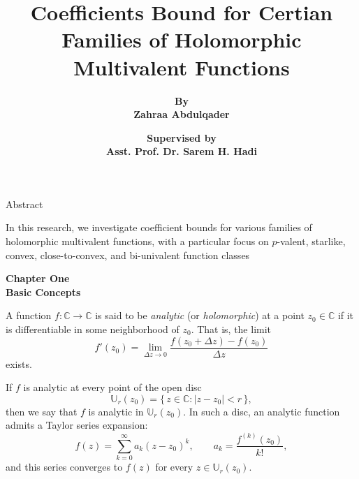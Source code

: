 \documentclass{beamer}
\title{Coefficients Bound for Certian Families of Holomorphic Multivalent Functions}
\author{\textbf{By}\\ \textbf{Zahraa Abdulqader}}
\date{\textbf{Supervised by}\\ \textbf{Asst. Prof. Dr. Sarem H. Hadi}}
\newcommand{\C}{\mathbb{C}}
\newcommand{\U}{\mathbb{U}}
\begin{document}
	\frame{\titlepage}
	
	
	\begin{frame}{Abstract}
		
		
		In this research, we investigate coefficient bounds for various families of holomorphic multivalent functions, with a particular focus on $p$-valent, starlike, convex, close-to-convex, and bi-univalent function classes
	\end{frame}
	
	\begin{frame}
		\begin{center}
			\Huge \textbf{Chapter One}\\[40pt]
			\textbf{Basic Concepts}
		\end{center}
	\end{frame}
	
	
	
	
	
	
	\begin{frame}
\begin{definition}
	
	A function \(f : \C \to \C\) is said to be \emph{analytic} (or \emph{holomorphic}) at a point \(z_0 \in \C\) if it is differentiable in some neighborhood of \(z_0\). That is, the limit
	\begin{equation}\label{eq:def-derivative}
		f'(z_0) = \lim_{\Delta z \to 0} \frac{f(z_0 + \Delta z) - f(z_0)}{\Delta z}
	\end{equation}
	exists.
	
	
	
	If \(f\) is analytic at every point of the open disc
	\[
	\U_r(z_0) = \{\, z \in \C : |z - z_0| < r \,\},
	\]
	then we say that \(f\) is analytic in \(\U_r(z_0)\). In such a disc, an analytic function admits a Taylor series expansion:
	\begin{equation}\label{eq:taylor}
		f(z) = \sum_{k=0}^{\infty} a_k (z - z_0)^k, 
		\qquad 
		a_k = \frac{f^{(k)}(z_0)}{k!},
	\end{equation}
	and this series converges to \(f(z)\) for every \(z \in \U_r(z_0)\).
\end{definition}
	\end{frame}
	
\end{document}
